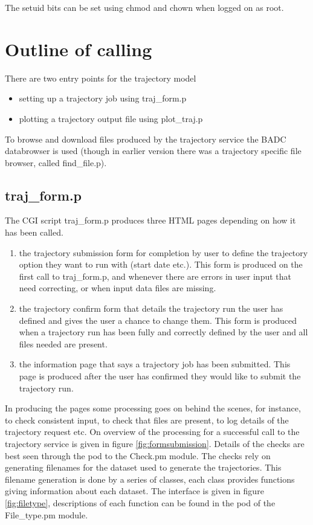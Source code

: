 \documentclass[a4paper]{article}
\begin{document}
The setuid bits can be set using chmod and chown when logged on as
root.

\section{Outline of calling}

There are two entry points for the trajectory model

\begin{itemize}
\item setting up a trajectory job using traj\_form.p
\item plotting a trajectory output file using plot\_traj.p
\end{itemize}

To browse and download files produced by the trajectory service the
BADC databrowser is used (though in earlier version there was a
trajectory specific file browser, called find\_file.p).

\subsection{traj\_form.p}

The CGI script traj\_form.p produces three HTML pages depending on
how it has been called.

\begin{enumerate}
\item the trajectory submission form for completion by user to define the
  trajectory option they want to run with (start date etc.).  This
  form is produced on the first call to traj\_form.p, and whenever
  there are errors in user input that need correcting, or when input
  data files are missing.
\item the trajectory confirm form that details the trajectory run the user
  has defined and gives the user a chance to change them.  This form
  is produced when a trajectory run has been fully and correctly
  defined by the user and all files needed are present.
\item the information page that says a trajectory job has been
  submitted. This page is produced after the user has confirmed they
  would like to submit the trajectory run.
\end{enumerate}

In producing the pages some processing goes on behind the scenes, for
instance, to check consistent input, to check that files are present,
to log details of the trajectory request etc. On overview of the
processing for a successful call to the trajectory service is given in
figure \ref{fig:formsubmission}.
  Details of the checks are best seen through the pod to the
Check.pm module.  The checks rely on generating filenames for the
dataset used to generate the trajectories.  This filename generation
is done by a series of classes, each class provides functions giving
information about each dataset.  The interface is given in figure 
\ref{fig:filetype},
descriptions of each function can be found in the pod of the
File\_type.pm module.
\end{document}
